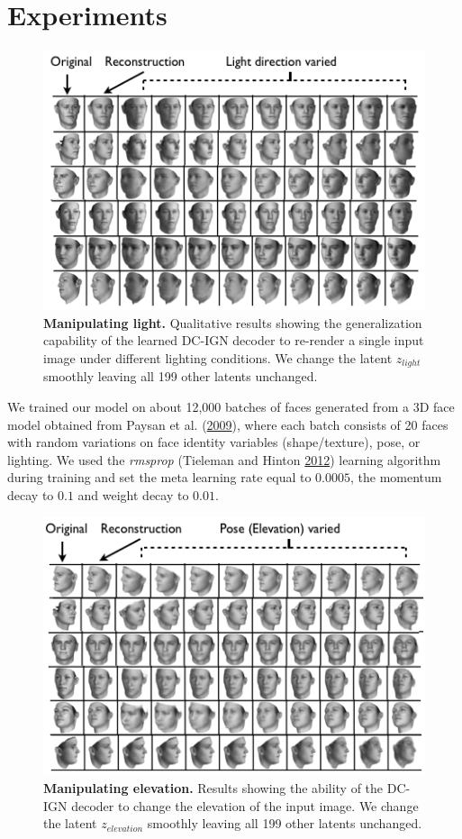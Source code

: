 \documentclass[12pt,twoside]{mitthesis}
\begin{document}
\section{Experiments}\label{experiments}

\begin{figure}[htbp]
\centering
\includegraphics{../figures/lightvaried.png}
\caption{\label{fig:manipulating_light}\textbf{Manipulating light.}
Qualitative results showing the generalization capability of the learned
DC-IGN decoder to re-render a single input image under different
lighting conditions. We change the latent \(z_{light}\) smoothly leaving
all 199 other latents unchanged.}
\end{figure}

We trained our model on about 12,000 batches of faces generated from a
3D face model obtained from Paysan et al.
(\protect\hyperlink{ref-paysan2009face}{2009}), where each batch
consists of 20 faces with random variations on face identity variables
(shape/texture), pose, or lighting. We used the \emph{rmsprop} (Tieleman
and Hinton \protect\hyperlink{ref-rmsprop}{2012}) learning algorithm
during training and set the meta learning rate equal to \(0.0005\), the
momentum decay to \(0.1\) and weight decay to \(0.01\).

\begin{figure}[htbp]
\centering
\includegraphics{../figures/elvaried.png}
\caption{\label{fig:manipulating_elevation}\textbf{Manipulating
elevation.} Results showing the ability of the DC-IGN decoder to change
the elevation of the input image. We change the latent \(z_{elevation}\)
smoothly leaving all 199 other latents unchanged.}
\end{figure}
\end{document}
